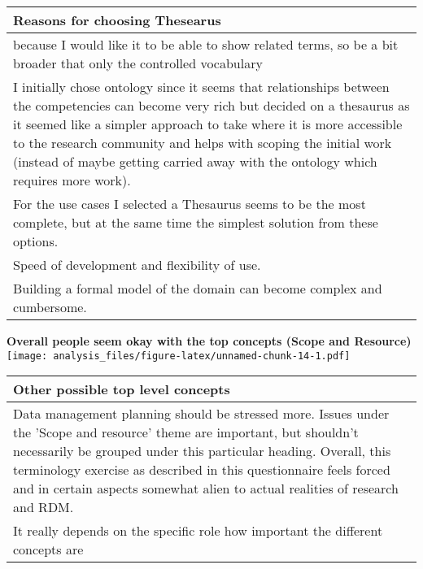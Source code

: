 \documentclass[]{article}
\begin{document}
\begin{table}[H]
\centering
\begin{tabular}{>{\raggedright\arraybackslash\columncolor{khaki}}p{30em}}
\hline
Reasons for choosing Thesearus\\
\hline
because I would like it to be able to show related terms, so be a bit broader that only the controlled vocabulary\\
\hline
I initially chose ontology since it seems that relationships between the competencies can become very rich but decided on a thesaurus as it seemed like a simpler approach to take where it is more accessible to the research community and helps with scoping the initial work (instead of maybe getting carried away with the ontology which requires more work).\\
\hline
For the use cases I selected a Thesaurus seems to be the most complete, but at the same time the simplest solution from these options.\\
\hline
Speed of development and flexibility of use.\\
\hline
Building a formal model of the domain can become complex and cumbersome.\\
\hline
\end{tabular}
\end{table}

\textbf{Overall people seem okay with the top concepts (Scope and
Resource)}
\texttt{[image: analysis\_files/figure-latex/unnamed-chunk-14-1.pdf]}

\begin{table}[H]
\centering
\begin{tabular}{>{\raggedright\arraybackslash\columncolor{khaki}}p{30em}}
\hline
Other possible top level concepts\\
\hline
Data management planning should be stressed more. Issues under the 'Scope and resource' theme are important, but shouldn't necessarily be grouped under this particular heading. Overall, this terminology exercise as described in this questionnaire feels forced and in certain aspects somewhat alien to actual realities of research and RDM.\\
\hline
It really depends on the specific role how important the different concepts are\\
\hline
\end{tabular}
\end{table}
\end{document}
